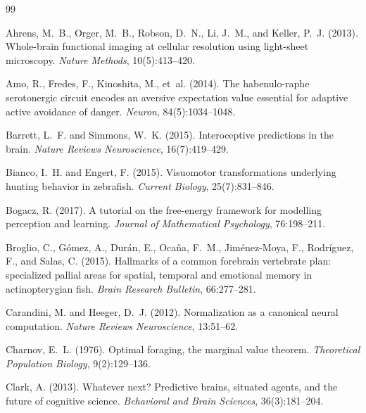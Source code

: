 \documentclass[12pt]{article}
\begin{document}
\begingroup
\renewcommand{\section}[2]{}  %
\begin{thebibliography}{99}

Ahrens, M.~B., Orger, M.~B., Robson, D.~N., Li, J.~M., and Keller, P.~J. (2013).
Whole-brain functional imaging at cellular resolution using light-sheet microscopy.
\textit{Nature Methods}, 10(5):413--420.

Amo, R., Fredes, F., Kinoshita, M., et~al. (2014).
The habenulo-raphe serotonergic circuit encodes an aversive expectation value essential for adaptive active avoidance of danger.
\textit{Neuron}, 84(5):1034--1048.

Barrett, L.~F. and Simmons, W.~K. (2015).
Interoceptive predictions in the brain.
\textit{Nature Reviews Neuroscience}, 16(7):419--429.

Bianco, I.~H. and Engert, F. (2015).
Visuomotor transformations underlying hunting behavior in zebrafish.
\textit{Current Biology}, 25(7):831--846.

Bogacz, R. (2017).
A tutorial on the free-energy framework for modelling perception and learning.
\textit{Journal of Mathematical Psychology}, 76:198--211.

Broglio, C., G{\'o}mez, A., Dur{\'a}n, E., Oca{\~n}a, F.~M., Jim{\'e}nez-Moya, F., Rodr{\'i}guez, F., and Salas, C. (2015).
Hallmarks of a common forebrain vertebrate plan: specialized pallial areas for spatial, temporal and emotional memory in actinopterygian fish.
\textit{Brain Research Bulletin}, 66:277--281.

Carandini, M. and Heeger, D.~J. (2012).
Normalization as a canonical neural computation.
\textit{Nature Reviews Neuroscience}, 13:51--62.

Charnov, E.~L. (1976).
Optimal foraging, the marginal value theorem.
\textit{Theoretical Population Biology}, 9(2):129--136.

Clark, A. (2013).
Whatever next? Predictive brains, situated agents, and the future of cognitive science.
\textit{Behavioral and Brain Sciences}, 36(3):181--204.


\end{thebibliography}
\end{document}
